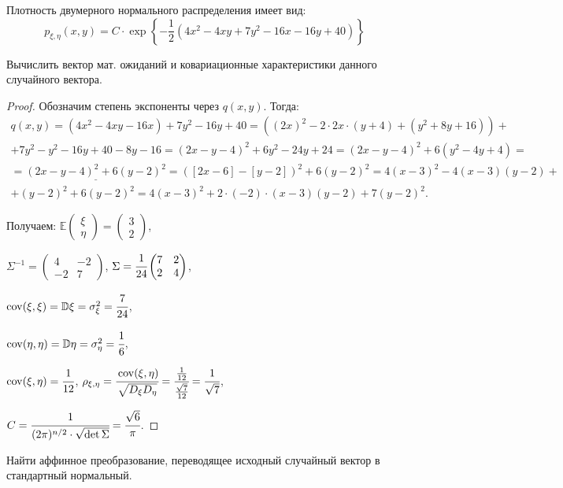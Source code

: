 
\renewcommand*{\proofname}{Решение}

Плотность двумерного нормального распределения имеет вид:
\[ p_{\xi,\eta}(x, y) = C \cdot \exp \left\{-\frac12(4x^2 - 4xy + 7y^2 - 16x - 16y + 40)\right\} \]

\begin{problem}
	Вычислить вектор мат. ожиданий и ковариационные характеристики данного случайного вектора.
\end{problem}

\begin{proof}
	Обозначим степень экспоненты через  $q(x,y)$. Тогда:
	\begin{multline} 
		q(x,y) = (4x^2-4xy-16x)+7y^2-16y+40=((2x)^2-2\cdot2x\cdot(y+4)+(y^2+8y+16))+\\+7y^2-y^2-16y+40-8y-16=(2x-y-4)^2+6y^2-24y+24=(2x-y-4)^2+6(y^2-4y+4)=\\=\underline{(2x-y-4)^2+6(y-2)^2}=([2x-6]-[y-2])^2+6(y-2)^2=4(x-3)^2-4(x-3)(y-2)+\\+(y-2)^2+6(y-2)^2=4(x-3)^2+2\cdot(-2)\cdot(x-3)(y-2)+7(y-2)^2.
	\end{multline}

	Получаем:	
	$ \mathbb E\begin{pmatrix} \xi \\ \eta \end{pmatrix} = \begin{pmatrix} 3 \\ 2 \end{pmatrix}$,
	
	$ \Sigma^{-1} = \begin{pmatrix} 4 & -2 \\ -2 & 7 \end{pmatrix} $, 
	$ \Sigma = \cfrac1{24}\begin{pmatrix} 7 & 2 \\ 2 & 4 \end{pmatrix} $,
	
	$  \operatorname{\mathop{cov}}(\xi, \xi)=\mathbb D\xi = \sigma^2_\xi = \cfrac7{24} $,
	
	$  \operatorname{\mathop{cov}}(\eta, \eta)=\mathbb D\eta = \sigma^2_\eta = \cfrac16 $,
	
	$ \operatorname{\mathop{cov}}(\xi, \eta) = \cfrac1{12} $,
	$ \rho_{\xi, \eta}= \cfrac{\operatorname{\mathop{cov}}(\xi, \eta)}{\sqrt{D_\xi D_\eta}}=\cfrac{\frac1{12}}{\frac{\sqrt{7}}{12}} = \cfrac1{\sqrt7} $,
	
	$ C = \cfrac1{(2\pi)^{n/2}\cdot\sqrt{\det\Sigma}} = \cfrac{\sqrt6}{\pi} $.
	
\end{proof}
\begin{problem}
	Найти аффинное преобразование, переводящее исходный случайный вектор в стандартный нормальный. 
\end{problem}

